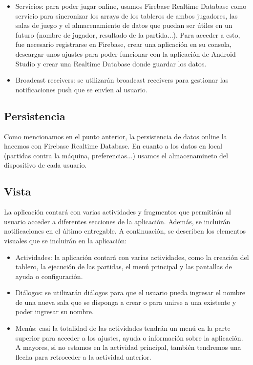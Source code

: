 \documentclass[a4paper, openright, 12pt]{article}
\begin{document}
\begin{itemize}
\begin{enumerate}
        \end{enumerate}
    \item Servicios: para poder jugar online, usamos Firebase Realtime Database como servicio para sincronizar los arrays de los tableros de ambos jugadores, las salas de juego y el almacenamiento de datos que puedan ser útiles en un futuro (nombre de jugador, resultado de la partida...). Para acceder a esto, fue necesario registrarse en Firebase, crear una aplicación en su consola, descargar unos ajustes para poder funcionar con la aplicación de Android Studio y crear una Realtime Database donde guardar los datos.
    \item Broadcast receivers: se utilizarán broadcast receivers para gestionar las notificaciones push que se envíen al usuario.
\end{itemize}

\subsection{Persistencia}
Como mencionamos en el punto anterior, la persistencia de datos online la hacemos con Firebase Realtime Database. En cuanto a los datos en local (partidas contra la máquina, preferencias...) usamos el almacenamineto del dispositivo de cada usuario.

\subsection{Vista}
La aplicación contará con varias actividades y fragmentos que permitirán al usuario acceder a diferentes secciones de la aplicación. Además, se incluirán notificaciones en el último entregable. A continuación, se describen los elementos visuales que se incluirán en la aplicación:
\begin{itemize}
    \item Actividades: la aplicación contará con varias actividades, como la creación del tablero, la ejecución de las partidas, el menú principal y las pantallas de ayuda o configuración.
    \item Diálogos: se utilizarán diálogos para que el usuario pueda ingresar el nombre de una nueva sala que se disponga a crear o para unirse a una existente y poder ingresar su nombre.
    \item Menús: casi la totalidad de las actividades tendrán un menú en la parte superior para acceder a los ajustes, ayuda o información sobre la aplicación. A mayores, si no estamos en la actividad principal, también tendremos una flecha para retroceder a la actividad anterior.
\end{itemize}
\end{document}
